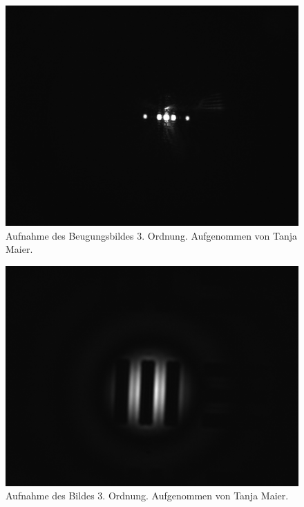 \documentclass{article}
\begin{document}
\begin{minipage}[t]{.45\textwidth}
\begin{figure}[H]
\includegraphics[scale=0.1]{tm/Beugungsbild_3.jpg}
\caption{Aufnahme des Beugungsbildes 3. Ordnung. Aufgenommen von Tanja Maier.}
\label{fig:bbild_3_tm}
\end{figure}
\end{minipage}
\hfill
\noindent
\begin{minipage}[t]{.45\textwidth}
\begin{figure}[H]
\includegraphics[scale=0.1]{tm/Bild_3.jpg}
\caption{Aufnahme des Bildes 3. Ordnung. Aufgenommen von Tanja Maier.}\label{fig:bild_3_tm}
\end{figure}
\end{minipage}
\end{document}

